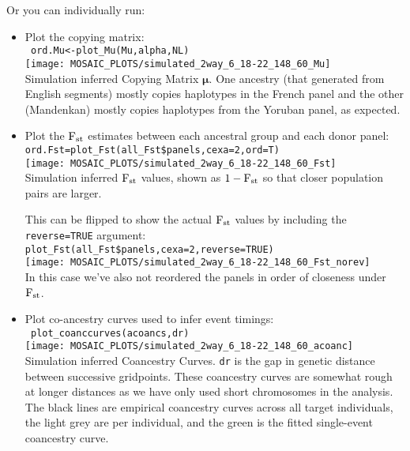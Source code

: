 \documentclass{article}
\begin{document}
Or you can individually run:
\begin{itemize}
  \item Plot the copying matrix:\\
\verb+ ord.Mu<-plot_Mu(Mu,alpha,NL) +\\
    \texttt{[image: MOSAIC\_PLOTS/simulated\_2way\_6\_18-22\_148\_60\_Mu]}\\
    Simulation inferred Copying Matrix $\bm\mu$. One ancestry (that generated from English segments)
    mostly copies haplotypes in the French panel and the other (Mandenkan) mostly copies haplotypes
    from the Yoruban panel, as expected. 
    
  \item Plot the $\textrm{F}_{\textrm{st}}$ estimates between each ancestral group and each donor panel:\\
    \verb+ord.Fst=plot_Fst(all_Fst$panels,cexa=2,ord=T)+\\
    \texttt{[image: MOSAIC\_PLOTS/simulated\_2way\_6\_18-22\_148\_60\_Fst]}\\
    Simulation inferred $\textrm{F}_{\textrm{st}}$ values, shown as $1-\textrm{F}_{\textrm{st}}$ so that closer population pairs are larger. 
    
    This can be flipped to show the
    actual $\textrm{F}_{\textrm{st}}$ values by including the \texttt{reverse=TRUE} argument:\\
    \verb+plot_Fst(all_Fst$panels,cexa=2,reverse=TRUE)+\\
    \texttt{[image: MOSAIC\_PLOTS/simulated\_2way\_6\_18-22\_148\_60\_Fst\_norev]}\\
    In this case we've also not reordered the panels in order of closeness under $\textrm{F}_{\textrm{st}}$. 

\item Plot co-ancestry curves used to infer event timings:\\
\verb+ plot_coanccurves(acoancs,dr)+\\
    \texttt{[image: MOSAIC\_PLOTS/simulated\_2way\_6\_18-22\_148\_60\_acoanc]}\\
    Simulation inferred Coancestry Curves. \texttt{dr} is the gap in genetic distance between successive gridpoints. 
    These coancestry curves are somewhat rough at longer distances as we have only used short chromosomes in the analysis. 
    The black lines are empirical coancestry curves across all target individuals, the light grey are per individual, and the green is
    the fitted single-event coancestry curve. 



\end{itemize}
\end{document}
